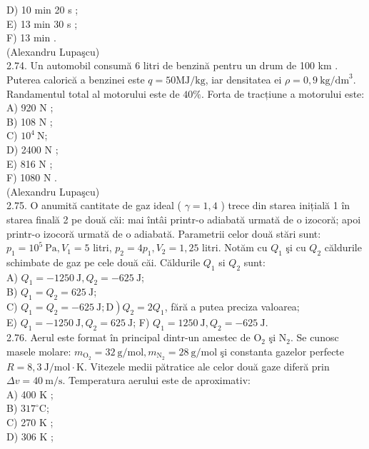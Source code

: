 D) 10 min 20 s ;\\
E) 13 min 30 s ;\\
F) 13 min .\\
(Alexandru Lupaşcu)\\
2.74. Un automobil consumă 6 litri de benzină pentru un drum de 100 km . Puterea calorică a benzinei este $q=50 \mathrm{MJ} / \mathrm{kg}$, iar densitatea ei $\rho=0,9 \mathrm{~kg} / \mathrm{dm}^{3}$. Randamentul total al motorului este de $40 \%$. Forta de tracțiune a motorului este:\\
A) 920 N ;\\
B) 108 N ;\\
C) $10^{4} \mathrm{~N}$;\\
D) 2400 N ;\\
E) 816 N ;\\
F) 1080 N .\\
(Alexandru Lupaşcu)\\
2.75. O anumită cantitate de gaz ideal ( $\gamma=1,4$ ) trece din starea inițială 1 în starea finală 2 pe două căi: mai întâi printr-o adiabată urmată de o izocoră; apoi printr-o izocoră urmată de o adiabată. Parametrii celor două stări sunt: $p_{1}=10^{5} \mathrm{~Pa}, V_{1}=5$ litri, $p_{2}=4 p_{1}, V_{2}=1,25$ litri. Notăm cu $Q_{1}$ şi cu $Q_{2}$ căldurile schimbate de gaz pe cele două căi. Căldurile $Q_{1}$ si $Q_{2}$ sunt:\\
A) $Q_{1}=-1250 \mathrm{~J}, Q_{2}=-625 \mathrm{~J}$;\\
B) $Q_{1}=Q_{2}=625 \mathrm{~J}$;\\
C) $\left.Q_{1}=Q_{2}=-625 \mathrm{~J} ; \mathrm{D}\right) Q_{2}=2 Q_{1}$, fără a putea preciza valoarea;\\
E) $Q_{1}=-1250 \mathrm{~J}, Q_{2}=625 \mathrm{~J}$; F) $Q_{1}=1250 \mathrm{~J}, Q_{2}=-625 \mathrm{~J}$.\\
2.76. Aerul este format în principal dintr-un amestec de $\mathrm{O}_{2}$ şi $\mathrm{N}_{2}$. Se cunosc masele molare: $m_{\mathrm{O}_{2}}=32 \mathrm{~g} / \mathrm{mol}, m_{\mathrm{N}_{2}}=28 \mathrm{~g} / \mathrm{mol}$ şi constanta gazelor perfecte $R=8,3 \mathrm{~J} / \mathrm{mol} \cdot \mathrm{K}$. Vitezele medii pătratice ale celor două gaze diferă prin $\Delta v=40 \mathrm{~m} / \mathrm{s}$. Temperatura aerului este de aproximativ:\\
A) 400 K ;\\
B) $317^{\circ} \mathrm{C}$;\\
C) 270 K ;\\
D) 306 K ;\\
